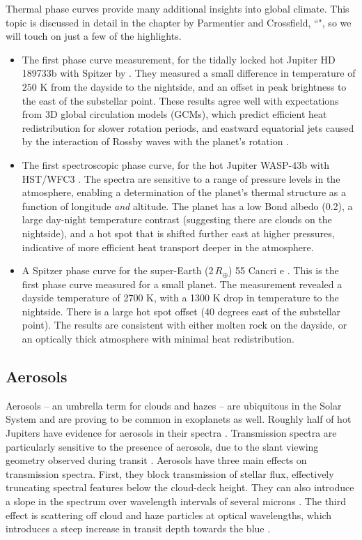 \documentclass[graybox,natbib,nosecnum]{svmult}
\begin{document}
Thermal phase curves provide many additional insights into global climate. This topic is discussed in detail in the chapter by Parmentier and Crossfield, ``", so we will touch on just a few of the highlights. 
\begin{itemize}
\item{The first phase curve measurement, for the tidally locked hot Jupiter HD 189733b with Spitzer by \cite{knutson07}. They measured a small difference in temperature of $250$ K from the dayside to the nightside, and an offset in peak brightness to the east of the substellar point. These results agree well with expectations from 3D global circulation models (GCMs), which predict efficient heat redistribution for slower rotation periods, and eastward equatorial jets caused by the interaction of Rossby waves with the planet's rotation \citep{showman09}.}
\item{The first spectroscopic phase curve, for the hot Jupiter WASP-43b with HST/WFC3 \citep{stevenson14}. The spectra are sensitive to a range of pressure levels in the atmosphere, enabling a determination of the planet's thermal structure as a function of longitude \emph{and} altitude. The planet has a low Bond albedo (0.2), a large day-night temperature contrast (suggesting there are clouds on the nightside), and a hot spot that is shifted further east at higher pressures, indicative of more efficient heat transport deeper in the atmosphere.}
\item{A Spitzer phase curve for the super-Earth (2\,$R_\oplus$) 55 Cancri e \citep{demory16}.  This is the first phase curve measured for a small planet.  The measurement revealed a dayside temperature of 2700 K, with a 1300 K drop in temperature to the nightside. There is a large hot spot offset (40 degrees east of the substellar point).  The results are consistent with either molten rock on the dayside, or an optically thick atmosphere with minimal heat redistribution.}
\end{itemize}

\subsection{Aerosols}
Aerosols -- an umbrella term for clouds and hazes -- are ubiquitous in the Solar System and are proving to be common in exoplanets as well. Roughly half of hot Jupiters have evidence for aerosols in their spectra \citep{sing16}. Transmission spectra are particularly sensitive to the presence of aerosols, due to the slant viewing geometry observed during transit \citep{fortney05}.  Aerosols have three main effects on transmission spectra.  First, they block transmission of stellar flux, effectively truncating spectral features below the cloud-deck height.  They can also introduce a slope in the spectrum over wavelength intervals of several microns \citep[e.g][]{sing16}.  The third effect is scattering off cloud and haze particles at optical wavelengths, which introduces a steep increase in transit depth towards the blue \citep[e.g.][]{pont08}.
\end{document}
